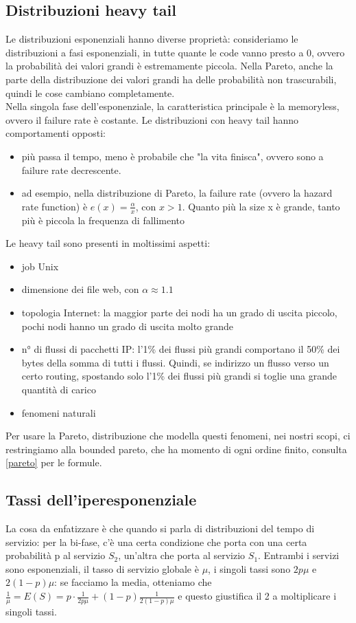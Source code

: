 \documentclass{article}
\begin{document}
\subsection{Distribuzioni heavy tail}
Le distribuzioni esponenziali hanno diverse proprietà: consideriamo le distribuzioni a fasi esponenziali, in tutte quante le code vanno presto a 0, ovvero la probabilità dei valori grandi è estremamente piccola. Nella Pareto, anche la parte della distribuzione dei valori grandi ha delle probabilità non trascurabili, quindi le cose cambiano completamente.\\ Nella singola fase dell'esponenziale, la caratteristica principale è la memoryless, ovvero il failure rate è costante. Le distribuzioni con heavy tail hanno comportamenti opposti:
\begin{itemize}
\item più passa il tempo, meno è probabile che "la vita finisca", ovvero sono a failure rate decrescente.
\item ad esempio, nella distribuzione di Pareto, la failure rate (ovvero la hazard rate function) è $e(x) = \frac{\alpha}{x}$, con $x > 1$. Quanto più la size x è grande, tanto più è piccola la frequenza di fallimento
\end{itemize}
Le heavy tail sono presenti in moltissimi aspetti:
\begin{itemize}
\item job Unix
\item dimensione dei file web, con $\alpha \approx 1.1$
\item topologia Internet: la maggior parte dei nodi ha un grado di uscita piccolo, pochi nodi hanno un grado di uscita molto grande
\item n° di flussi di pacchetti IP: l'1\% dei flussi più grandi comportano il 50\% dei bytes della somma di tutti i flussi. Quindi, se indirizzo un flusso verso un certo routing, spostando solo l'1\% dei flussi più grandi si toglie una grande quantità di carico
\item fenomeni naturali
\end{itemize}
Per usare la Pareto, distribuzione che modella questi fenomeni, nei nostri scopi, ci restringiamo alla bounded pareto, che ha momento di ogni ordine finito, consulta \ref{pareto} per le formule.
\subsection{Tassi dell'iperesponenziale}
La cosa da enfatizzare è che quando si parla di distribuzioni del tempo di servizio: per la bi-fase, c'è una certa condizione che porta con una certa probabilità p al servizio $S_2$, un'altra che porta al servizio $S_1$. Entrambi i servizi sono esponenziali, il tasso di servizio globale è $\mu$, i singoli tassi sono $2p\mu$ e $2(1-p)\mu$: se facciamo la media, otteniamo che $\frac{1}{\mu} = E(S) = p\cdot \frac{1}{2p\mu}  + (1 - p)\frac{1}{2(1 - p)\mu}$ e questo giustifica il 2 a moltiplicare i singoli tassi.
\end{document}

